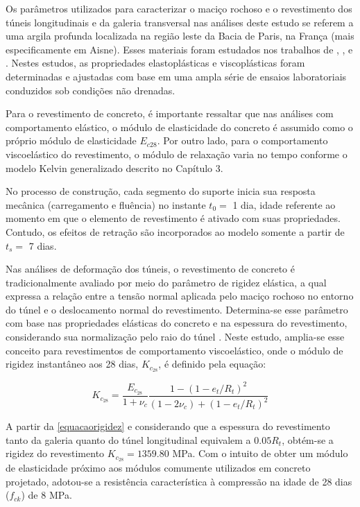 Os parâmetros utilizados para caracterizar o maciço rochoso e o revestimento dos túneis longitudinais e da galeria transversal nas análises deste estudo se referem a uma argila profunda localizada na região leste da Bacia de Paris, na França (mais especificamente em Aisne). Esses materiais foram estudados nos trabalhos de , ,  e . Nestes estudos, as propriedades elastoplásticas e viscoplásticas foram determinadas e ajustadas com base em uma ampla série de ensaios laboratoriais conduzidos sob condições não drenadas. %

Para o revestimento de concreto, é importante ressaltar que nas análises com comportamento elástico, o módulo de elasticidade do concreto é assumido como o próprio módulo de elasticidade $E_{c28}$. Por outro lado, para o comportamento viscoelástico do revestimento, o módulo de relaxação varia no tempo conforme o modelo Kelvin generalizado descrito no Capítulo 3.

No processo de construção, cada segmento do suporte inicia sua resposta mecânica (carregamento e fluência) no instante $t_0 =$ 1 dia, idade referente ao momento em que o elemento de revestimento é ativado com suas propriedades. Contudo, os efeitos de retração são incorporados ao modelo somente a partir de $t_s =$ 7 dias.

Nas análises de deformação dos túneis, o revestimento de concreto é tradicionalmente avaliado por meio do parâmetro de rigidez elástica, a qual expressa a relação entre a tensão normal aplicada pelo maciço rochoso no entorno do túnel e o deslocamento normal do revestimento. Determina-se esse parâmetro com base nas propriedades elásticas do concreto e na espessura do revestimento, considerando sua normalização pelo raio do túnel \cite{Panet1995,HoekBrown1980}. Neste estudo, amplia-se esse conceito para revestimentos de comportamento viscoelástico, onde o módulo de rigidez instantâneo aos 28 dias, $K_{c_{28}}$, é definido pela equação:

\begin{equation}
	K_{c_{28}}=\dfrac{E_{c_{28}}}{1+\nu_c} \dfrac{1-(1-e_t/R_t)^2}{(1-2\nu_c)+ (1-e_t/R_t)^2}
	\label{equacaorigidez}
\end{equation}

A partir da \autoref{equacaorigidez} e considerando que a espessura do revestimento tanto da galeria quanto do túnel longitudinal equivalem a $0.05R_t$, obtém-se a rigidez do revestimento $K_{c_{28}}=1359.80$ MPa. Com o intuito de obter um módulo de elasticidade próximo aos módulos comumente utilizados em concreto projetado, adotou-se a resistência característica à compressão na idade de 28 dias ($f_{ck}$) de 8 MPa.

